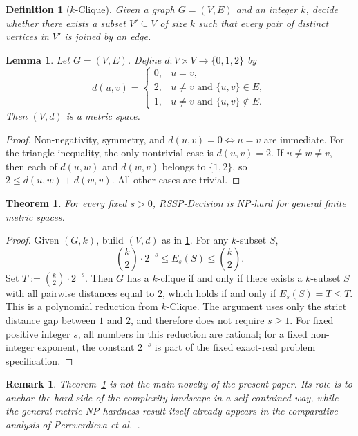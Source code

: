 \documentclass[11pt]{article}
\newtheorem{theorem}{Theorem}
\newtheorem{definition}{Definition}
\newtheorem{lemma}{Lemma}
\newtheorem{remark}{Remark}
\newcommand{\bin}[1]{\binom{#1}{2}}
\begin{document}
\begin{definition}[$k$-Clique]
Given a graph $G=(V,E)$ and an integer $k$, decide whether there exists a subset $V'\subseteq V$ of size $k$ such that every pair of distinct vertices in $V'$ is joined by an edge.
\end{definition}

\begin{lemma}\label{lem:metric}
Let $G=(V,E)$. Define $d:V\times V\to\{0,1,2\}$ by
\[
d(u,v)=\begin{cases}
0,&u=v,\\
2,&u\ne v\text{ and }\{u,v\}\in E,\\
1,&u\ne v\text{ and }\{u,v\}\notin E.
\end{cases}
\]
Then $(V,d)$ is a metric space.
\end{lemma}

\begin{proof}
Non-negativity, symmetry, and $d(u,v)=0\Leftrightarrow u=v$ are immediate. For the triangle inequality, the only nontrivial case is $d(u,v)=2$. If $u\neq w\neq v$, then each of $d(u,w)$ and $d(w,v)$ belongs to $\{1,2\}$, so $2\le d(u,w)+d(w,v)$. All other cases are trivial.
\end{proof}

\begin{theorem}\label{thm:metric}
For every fixed $s>0$, RSSP-Decision is NP-hard for general finite metric spaces.
\end{theorem}

\begin{proof}
Given $(G,k)$, build $(V,d)$ as in \cref{lem:metric}. For any $k$-subset $S$,
\[
\bin{k}\cdot 2^{-s}\le E_s(S)\le \bin{k}.
\]
Set $T:=\bin{k}\cdot 2^{-s}$. Then $G$ has a $k$-clique if and only if there exists a $k$-subset $S$ with all pairwise distances equal to $2$, which holds if and only if $E_s(S)=T\le T$. This is a polynomial reduction from $k$-Clique. The argument uses only the strict distance gap between $1$ and $2$, and therefore does not require $s\ge 1$. For fixed positive integer $s$, all numbers in this reduction are rational; for a fixed non-integer exponent, the constant $2^{-s}$ is part of the fixed exact-real problem specification.
\end{proof}

\begin{remark}
Theorem~\ref{thm:metric} is not the main novelty of the present paper. Its role is to anchor the hard side of the complexity landscape in a self-contained way, while the general-metric NP-hardness result itself already appears in the comparative analysis of Pereverdieva et al.~\cite{PereverdievaEtAl2025}.
\end{remark}
\end{document}
